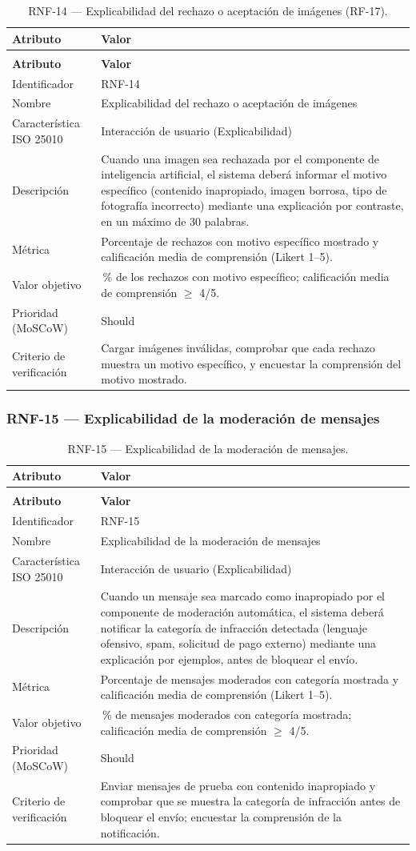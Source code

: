 \documentclass[journal,onecolumn]{IEEEtran}
\makeatletter
\newenvironment{atributos}[2]{%
	\small
	\begin{longtable}{@{}>{\raggedright\arraybackslash}p{4.2cm} >{\raggedright\arraybackslash}p{11.2cm}@{}}
		\caption{#2}\label{tab:#1}\\
		\toprule
		\textbf{Atributo} & \textbf{Valor} \\
		\midrule
		\endfirsthead
		\multicolumn{2}{@{}l}{\small\itshape (continuación)}\\
		\toprule
		\textbf{Atributo} & \textbf{Valor} \\
		\midrule
		\endhead
		\bottomrule
		\endlastfoot
	}{%
	\end{longtable}
	\normalsize
}
\makeatother
\begin{document}
	\begin{atributos}{RNF-14}{RNF-14 --- Explicabilidad del rechazo o aceptación de imágenes (RF-17).}
		Identificador & RNF-14 \\
		Nombre & Explicabilidad del rechazo o aceptación de imágenes \\
		Característica ISO 25010 & Interacción de usuario (Explicabilidad) \\
		Descripción & Cuando una imagen sea rechazada por el componente de inteligencia artificial, el sistema deberá informar el motivo específico (contenido inapropiado, imagen borrosa, tipo de fotografía incorrecto) mediante una explicación por contraste, en un máximo de 30 palabras. \\
		Métrica & Porcentaje de rechazos con motivo específico mostrado y calificación media de comprensión (Likert 1--5). \\
		Valor objetivo & 100\,\% de los rechazos con motivo específico; calificación media de comprensión $\geq$ 4/5. \\
		Prioridad (MoSCoW) & Should \\
		Criterio de verificación & Cargar imágenes inválidas, comprobar que cada rechazo muestra un motivo específico, y encuestar la comprensión del motivo mostrado. \\
	\end{atributos}
	
	\subsubsection{RNF-15 --- Explicabilidad de la moderación de mensajes}
	
	\begin{atributos}{RNF-15}{RNF-15 --- Explicabilidad de la moderación de mensajes.}
		Identificador & RNF-15 \\
		Nombre & Explicabilidad de la moderación de mensajes \\
		Característica ISO 25010 & Interacción de usuario (Explicabilidad) \\
		Descripción & Cuando un mensaje sea marcado como inapropiado por el componente de moderación automática, el sistema deberá notificar la categoría de infracción detectada (lenguaje ofensivo, spam, solicitud de pago externo) mediante una explicación por ejemplos, antes de bloquear el envío. \\
		Métrica & Porcentaje de mensajes moderados con categoría mostrada y calificación media de comprensión (Likert 1--5). \\
		Valor objetivo & 100\,\% de mensajes moderados con categoría mostrada; calificación media de comprensión $\geq$ 4/5. \\
		Prioridad (MoSCoW) & Should \\
		Criterio de verificación & Enviar mensajes de prueba con contenido inapropiado y comprobar que se muestra la categoría de infracción antes de bloquear el envío; encuestar la comprensión de la notificación. \\
	\end{atributos}
	
\end{document}
